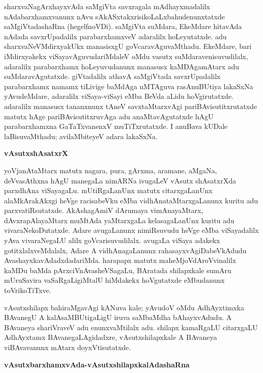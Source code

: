 \newpage

sharxvaNagArxhayxvAda saMgiVta savxragala mAdhayxmadalilx nAdabarxhamxvanunx nAvu sAkASx\-takxrisikoLaLxbahudenunxtatxde saMgiVtadashaRna (hegelfnoVDi). saMgiVta suMdara, EkeMdare hitavAda nAdada savxrUpadalilx parabarxhamxveV adaralilx hoLeyutatxde. adu sharxvaNeVMdirxyakUkx manasisxgU goVcaravAguvaMthadu. EkeMdare, bari iMdirxyakekx viSayavAguvudariMdaleV oMdu vasutx suMdaravenisuvudilalx, adaralilx parabarxhamx hoLeyuvudanunx manasusx kaMDAgamAtarx adu suMdaravAgutatxde. giVtadalilx athavA saMgiVtada savxrUpadalilx parabarxhamx namamx tiLivige baMdAga uMTAguva rasAnuBUtiya lakaSxNa yAvudeMdare, adaralilx viSaya-viSayi eMba BeVda aLidu hoVgirutatxde. adaralilx manasusx tananxnunx tAneV savxtaMtarxvAgi pariBAvisutitxrutatxde matutx hAge pariBAvisutitxruvAga adu anaMtavAgutatxde hAgU parabarxhamxna GaTaTxvanenxV muTiTxrutatxde. I anuBava kUDale laBisuvaMthadu; avilaMbiteyeV adara lakaSxNa.

\bigskip
\begin{center}
{\Large\bf vAsutxshAsatxrX}
\end{center}

yoVjanAtaMtarx matutx nagara, pura, gArxma, aramane, aMgaNa, deVvasAthxna hAgU manegaLa nimARNa ivugaLeV vAsutx shAsatxrXda parxdhAna viSayagaLu. mUtiRgaLanUnx matutx citarxgaLanUnx alaMkArakAkxgi heVge racisabeVku eMba vidhAnataMtarxgaLanunx kuritu adu parxvatiRsutatxde. AkAshagAmiV dArumaya vimAnayaMtarx, dAvxrapAlayaMtarx muMtAda yaMtarxgaLa kelasagaLanUnx kuritu adu vivaraNekoDutatxde. Adare avugaLanunx nimiRsuvudu heVge eMba viSayadalilx yAva vivaraNegaLU alilx goVcarisuvudilalx. avugaLa viSaya adakekx gotitxlalxveMdalalx, Adare A vidhAnagaLanunx rahasayxvAgiDabeVkAdudu AvashayxkavAdadxdadariMda. harapapx matutx maheMjoVdAroVvinalilx kaMDu baMda pArxciVnAvasheVSagaLu, BAratada shilapxkale sumAru mUruSavira vaSaRgaLigiMtalU hiMdakekx hoVgutatxde eMbudanunx toVrikoTiTxve.

vAsutxshilapx bahiraMgavAgi kANuva kale; yAvudoV oMdu AdhAyxtimxka BAvanegU A kalAsaMBUtigaLigU iruva saMbaMdha bAhayxvAdudu. A BAvaneya shariVraveV adu enunxvaMtilalx adu. shilapx kamaRgaLU citarxgaLU AdhAyxtamx BAvanegaLAgidadxre, vAsutxshilapxkale A BAvaneya viBAvavanunx mAtarx doyxVtisutatxde.

\bigskip
\begin{center}
{\Large\bf vAsutxbarxhamxvAda-vAsutxshilapxkalAdashaRna}
\end{center}

